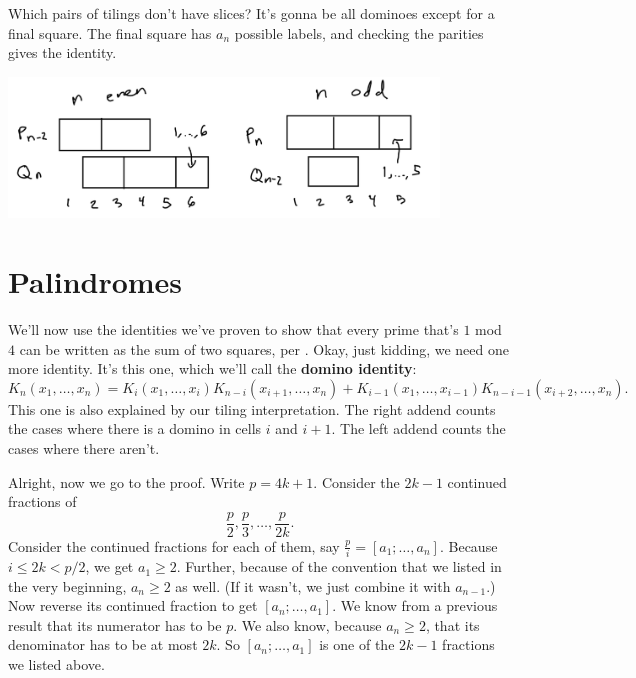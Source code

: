 \documentclass[11pt,paper=letter]{scrartcl}
\begin{document}
Which pairs of tilings don't have slices? It's gonna be all dominoes except for a final square. The final square has $a_n$ possible labels, and checking the parities gives the identity.

\begin{center}
\includegraphics[width=4.5in]{7.png}
\end{center}

\section{Palindromes}

We'll now use the identities we've proven to show that every prime that's $1$ mod $4$ can be written as the sum of two squares, per \cite{benjamin2}. Okay, just kidding, we need one more identity. It's this one, which we'll call the \textbf{domino identity}: \[
  K_n(x_1, \ldots, x_n)
  = K_i(x_1, \ldots, x_i)K_{n-i}(x_{i+1}, \ldots, x_n)
  + K_{i-1}(x_1, \ldots, x_{i-1})K_{n-i-1}(x_{i+2}, \ldots, x_n).
\]
This one is also explained by our tiling interpretation. The right addend counts the cases where there is a domino in cells $i$ and $i+1$. The left addend counts the cases where there aren't.

Alright, now we go to the proof. Write $p = 4k + 1$. Consider the $2k - 1$ continued fractions of \[
  \frac{p}{2}, \frac{p}{3}, \dots, \frac{p}{2k}.
\]
Consider the continued fractions for each of them, say $\frac{p}{i} = [a_1; \ldots, a_n]$. Because $i \le 2k < p/2$, we get $a_1 \ge 2$. Further, because of the convention that we listed in the very beginning, $a_n \ge 2$ as well. (If it wasn't, we just combine it with $a_{n-1}$.) Now reverse its continued fraction to get $[a_n; \ldots, a_1]$. We know from a previous result that its numerator has to be $p$. We also know, because $a_n \ge 2$, that its denominator has to be at most $2k$. So $[a_n; \ldots, a_1]$ is one of the $2k - 1$ fractions we listed above.
\end{document}
